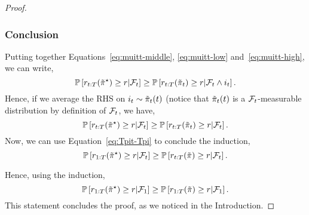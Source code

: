 \begin{proof}
\subsubsection{Conclusion}
Putting together Equations~\ref{eq:muitt-middle}, \ref{eq:muitt-low} and~\ref{eq:muitt-high}, we can write,
\[
  \mathbb{P}\left[r_{t:T}(\Tilde{\pi}^\star) \geq r| \mathcal{F}_t\right] \geq \mathbb{P}\left[r_{t:T}(\Tilde{\pi}_t) \geq r| \mathcal{F}_t \land i_t\right]. 
\]
Hence, if we average the RHS on $i_t \sim \Tilde{\pi}_t(t)$ (notice that $\Tilde{\pi}_t(t)$ is a $\mathcal{F}_t$-measurable distribution by definition of $\mathcal{F}_t$, we have,
\[
  \mathbb{P}\left[r_{t:T}(\Tilde{\pi}^\star) \geq r| \mathcal{F}_t\right] \geq \mathbb{P}\left[r_{t:T}(\Tilde{\pi}_t) \geq r| \mathcal{F}_t \right]. 
\]
Now, we can use Equation~\ref{eq:Tpit-Tpi} to conclude the induction, 
\[
  \mathbb{P}\left[r_{1:T}(\Tilde{\pi}^\star) \geq r| \mathcal{F}_t\right] \geq \mathbb{P}\left[r_{t:T}(\Tilde{\pi}) \geq r | \mathcal{F}_t \right]. 
\]

Hence, using the induction,
\[
  \mathbb{P}\left[r_{1:T}(\Tilde{\pi}^\star) \geq r| \mathcal{F}_1\right] \geq \mathbb{P}\left[r_{1:T}(\Tilde{\pi}) \geq r | \mathcal{F}_1 \right]. 
\]
This statement concludes the proof, as we noticed in the Introduction.
\end{proof}

